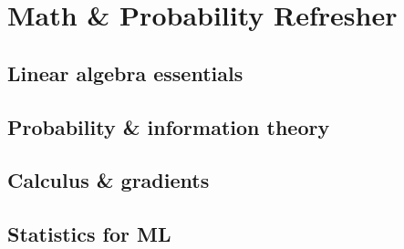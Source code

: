 
\section{Math \& Probability Refresher}

\subsection{Linear algebra essentials}


\subsection{Probability \& information theory}


\subsection{Calculus \& gradients}


\subsection{Statistics for ML}


